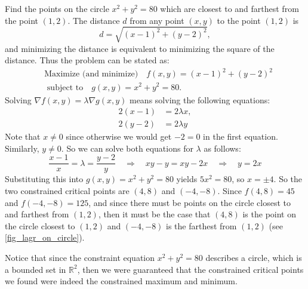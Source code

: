 \begin{example}\label{ex_lagr_circle}
Find the points on the circle $x^2 + y^2 = 80$ which are closest to and farthest from the point $(1,2)$.
\solution
The distance $d$ from any point $(x,y)$ to the point $(1,2)$ is
  \[d=\sqrt{(x-1)^2 + (y-2)^2},\]
 and minimizing the distance is equivalent to minimizing the square of the distance. Thus the problem can be stated as:
 \begin{align*}
 &\text{Maximize (and minimize)}\quad f(x,y) = (x-1)^2 + (y-2)^2\\
 &\text{ subject to}\quad g(x,y) = x^2 + y^2 = 80.
 \end{align*}
 Solving $\nabla f(x,y) = \lambda \nabla g(x,y)$ means solving the following equations:
 \begin{align*}
  2(x-1) &= 2\lambda x ,\\
  2(y-2) &= 2\lambda y
 \end{align*}
 Note that $x \ne 0$ since otherwise we would get $-2=0$ in the first equation. Similarly, $y \ne 0$. So we can solve both equations for $\lambda$ as follows:
 \[
  \frac{x-1}x=\lambda=\frac{y-2}y\quad\Rightarrow\quad
  xy-y=xy-2x\quad\Rightarrow\quad
  y=2x
 \]
%
 Substituting this into $g(x,y) = x^2 + y^2 = 80$ yields $5x^2=80$, so $x=\pm 4$. So the two constrained critical points are $(4,8)$ and $(-4,-8)$. Since $f(4,8)=45$ and $f(-4,-8)=125$, and since there must be points on the circle closest to and farthest from $(1,2)$, then it must be the case that $(4,8)$ is the point on the circle closest to $(1,2)$ and $(-4,-8)$ is the farthest from $(1,2)$ (see \autoref{fig_lagr_on_circle}).
 
 Notice that since the constraint equation $x^2 + y^2 = 80$ describes a circle, which is a bounded set in $\mathbb{R}^2$, then we were guaranteed that the constrained critical points we found were indeed the constrained maximum and  minimum.
\end{example}

